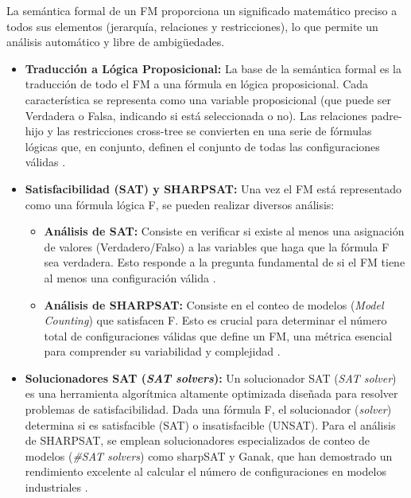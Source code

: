 {{{            La semántica formal de un \ac{FM} proporciona un
            significado matemático preciso a todos sus elementos (jerarquía, relaciones y
            restricciones), lo que permite un análisis automático y libre de ambigüedades.
            \begin{itemize}
                \item \textbf{Traducción a Lógica Proposicional:} La base de la semántica formal es
                la traducción de todo el \ac{FM} a una fórmula en lógica proposicional. Cada
                característica se representa como una variable proposicional (que puede
                ser Verdadera o Falsa, indicando si está seleccionada o no). Las
                relaciones padre-hijo y las restricciones cross-tree se convierten en una
                serie de fórmulas lógicas que, en conjunto, definen el conjunto de todas
                las configuraciones válidas \citep{sundermann2023sat, thum2014featureide}.
                \item \textbf{Satisfacibilidad (\ac{SAT}) y \ac{SHARPSAT}:} Una vez el \ac{FM} está representado como
                una fórmula lógica F, se pueden realizar diversos análisis:
                    \begin{itemize}
                        \item \textbf{Análisis de \ac{SAT}:} Consiste en verificar si existe al menos una
                        asignación de valores (Verdadero/Falso) a las variables que haga
                        que la fórmula F sea verdadera. Esto responde a la pregunta
                        fundamental de si el \ac{FM} tiene al menos una configuración válida
                        \citep{sundermann2023sat, benavides2010automated,mendonca2009SAT}.
                        \item \textbf{Análisis de \ac{SHARPSAT}:} Consiste en el conteo de modelos (\textit{Model Counting}) que
                        satisfacen F. Esto es crucial para determinar el número total de configuraciones válidas que
                        define un \ac{FM}, una métrica esencial para comprender su
                        variabilidad y complejidad \citep{sundermann2023sat, benavides2010automated,mendonca2009SAT}.
                    \end{itemize}
                \item \textbf{Solucionadores SAT (\textit{SAT solvers}):} Un solucionador SAT (\textit{SAT solver}) es una herramienta algorítmica altamente
                optimizada diseñada para resolver problemas de satisfacibilidad. Dada
                una fórmula F, el solucionador (\textit{solver}) determina si es satisfacible (\ac{SAT}) o insatisfacible
                (UNSAT). Para el análisis de \ac{SHARPSAT}, se emplean solucionadores especializados de conteo de modelos (\textit{\#SAT solvers})
                como sharpSAT y Ganak, que han demostrado un
                rendimiento excelente al calcular el número de configuraciones en
                modelos industriales \citep{sundermann2023sat, soos2020Ganak}.
            \end{itemize}
            
}}}
